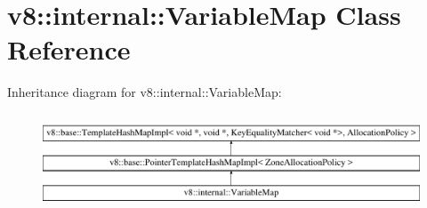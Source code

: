 \hypertarget{classv8_1_1internal_1_1VariableMap}{}\section{v8\+:\+:internal\+:\+:Variable\+Map Class Reference}
\label{classv8_1_1internal_1_1VariableMap}
Inheritance diagram for v8\+:\+:internal\+:\+:Variable\+Map\+:\begin{figure}[H]
\begin{center}
\leavevmode
\includegraphics[height=2.891566cm]{classv8_1_1internal_1_1VariableMap}
\end{center}
\end{figure}
